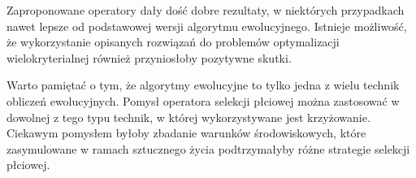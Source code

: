 \documentclass[./FM_mgr.tex]{subfiles}
\begin{document}
Zaproponowane operatory dały dość dobre rezultaty, w niektórych przypadkach nawet lepsze od podstawowej wersji algorytmu ewolucyjnego.
Istnieje możliwość, że wykorzystanie opisanych rozwiązań do problemów optymalizacji wielokryterialnej również przyniosłoby pozytywne skutki.

Warto pamiętać o tym, że algorytmy ewolucyjne to tylko jedna z wielu technik obliczeń ewolucyjnych.
Pomysł operatora selekcji płciowej można zastosować w dowolnej z tego typu technik, w której wykorzystywane jest krzyżowanie.
Ciekawym pomysłem byłoby zbadanie warunków środowiskowych, które zasymulowane w ramach sztucznego życia podtrzymałyby różne strategie selekcji płciowej.
\end{document}
